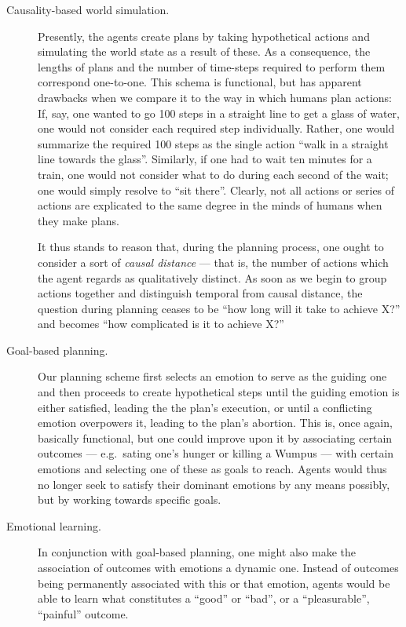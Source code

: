 \begin{description}
	\item[Causality-based world simulation.] Presently, the agents create plans by taking hypothetical actions and simulating the world state as a result of these. As a consequence, the lengths of plans and the number of time-steps required to perform them correspond one-to-one.
	This schema is functional, but has apparent drawbacks when we compare it to the way in which humans plan actions: If, say, one wanted to go 100 steps in a straight line to get a glass of water, one would not consider each required step individually. Rather, one would summarize the required 100 steps as the single action ``walk in a straight line towards the glass''. Similarly, if one had to wait ten minutes for a train, one would not consider what to do during each second of the wait; one would simply resolve to ``sit there''. Clearly, not all actions or series of actions are explicated to the same degree in the minds of humans when they make plans.
	
	 It thus stands to reason that, during the planning process, one ought to consider a sort of {\em causal distance} --- that is, the number of actions which the agent regards as qualitatively distinct. As soon as we begin to group actions together and distinguish temporal from causal distance, the question during planning ceases to be ``how long will it take to achieve X?'' and becomes ``how complicated is it to achieve X?''
	 
	 \item[Goal-based planning.] Our planning scheme first selects an emotion to serve as the guiding one and then  proceeds to create hypothetical steps until the guiding emotion is either satisfied, leading the the plan's execution, or until a conflicting emotion overpowers it, leading to the plan's abortion. This is, once again, basically functional, but one could improve upon it by associating certain outcomes --- e.g.\ sating one's hunger or killing a Wumpus --- with certain emotions and selecting one of these as goals to reach. Agents would thus no longer seek to satisfy their dominant emotions by any means possibly, but by working towards specific goals. 
	 
	 \item[Emotional learning.] In conjunction with goal-based planning, one might also make the association of outcomes with emotions a dynamic one. Instead of outcomes being permanently associated with this or that emotion, agents would be able to learn what constitutes a ``good'' or ``bad'', or a ``pleasurable'', ``painful'' outcome. 
	 

\end{description}
